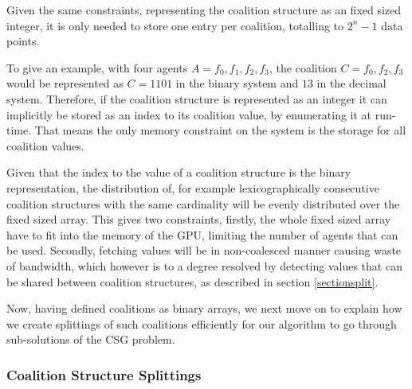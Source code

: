 \documentclass{llncs}
\begin{document}
Given the same constraints, representing the coalition structure as an fixed sized integer, it is only 
needed to store one entry per coalition, totalling to \begin{math}2^n-1\end{math} data points.

To give an example, with four agents $A = {f_0,f_1,f_2,f_3}$, the coalition $C = {f_0,f_2,f_3}$ would be represented as $C = 1101$ in the binary system and $13$ in the decimal system. Therefore, if the coalition structure is represented as an integer it can implicitly be stored as an index to its coalition value, by enumerating it at run-time. That means the only memory constraint on the system is the storage for all coalition values.

Given that the index to the value of a coalition structure is the binary representation, the distribution of, for example
lexicographically consecutive coalition structures with the same cardinality will be evenly distributed over the fixed sized array.
This gives two constraints, firstly, the whole fixed sized array have to fit into the memory of the GPU, limiting the number of agents that can be used. Secondly, fetching values will be in non-coalesced manner causing waste of bandwidth, which however is to a degree resolved by detecting values that can be shared between coalition structures, as described in section \ref{sectionsplit}.


Now, having defined coalitions as binary arrays, we next move on to explain how we create splittings of such coalitions efficiently for our algorithm to go through sub-solutions of the CSG problem.
\subsubsection{Coalition Structure Splittings}

\end{document}
